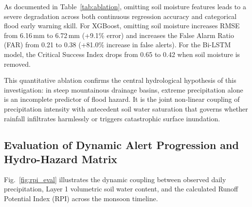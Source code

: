 \documentclass[journal]{IEEEtran}
\begin{document}
\begin{table}[htbp]
\centering
\caption{Ablation Analysis: Impact of Incorporating Soil Moisture Saturation States on 24-Hour Flood Warning Skill}
\label{tab:ablation}
\end{table}

As documented in Table~\ref{tab:ablation}, omitting soil moisture features leads to a severe degradation across both continuous regression accuracy and categorical flood early warning skill. For XGBoost, omitting soil moisture increases RMSE from 6.16\,mm to 6.72\,mm (+9.1\% error) and increases the False Alarm Ratio (FAR) from 0.21 to 0.38 (+81.0\% increase in false alerts). For the Bi-LSTM model, the Critical Success Index drops from 0.65 to 0.42 when soil moisture is removed.

This quantitative ablation confirms the central hydrological hypothesis of this investigation: in steep mountainous drainage basins, extreme precipitation alone is an incomplete predictor of flood hazard. It is the joint non-linear coupling of precipitation intensity with antecedent soil water saturation that governs whether rainfall infiltrates harmlessly or triggers catastrophic surface inundation.

\subsection{Evaluation of Dynamic Alert Progression and Hydro-Hazard Matrix}
Fig.~\ref{fig:rpi_eval} illustrates the dynamic coupling between observed daily precipitation, Layer 1 volumetric soil water content, and the calculated Runoff Potential Index (RPI) across the monsoon timeline.
\end{document}
